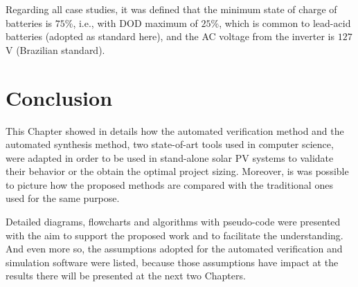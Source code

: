 Regarding all case studies, it was defined that the minimum state of charge of batteries is $75$\%, i.e., with DOD maximum of $25$\%, which is common to lead-acid batteries (adopted as standard here), and the AC voltage from the inverter is $127$ V (Brazilian standard).


\section{Conclusion}

This Chapter showed in details how the automated verification method and the automated synthesis method, two state-of-art tools used in computer science, were adapted in order to be used in stand-alone solar PV systems to validate their behavior or the obtain the optimal project sizing. Moreover, is was possible to picture how the proposed methods are compared with the traditional ones used for the same purpose.

Detailed diagrams, flowcharts and algorithms with pseudo-code were presented with the aim to support the proposed work and to facilitate the understanding. And even more so, the assumptions adopted for the automated verification and simulation software were listed, because those assumptions have impact at the results there will be presented at the next two Chapters.

